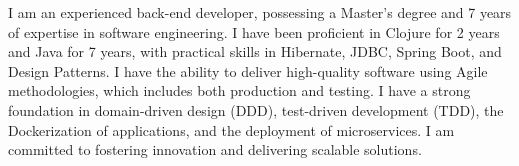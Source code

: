 \begin{referees}
\par{
    I am an experienced back-end developer, possessing a Master's degree and 7 years of expertise in software engineering. I have been proficient in Clojure for 2 years and Java for 7 years, with practical skills in Hibernate, JDBC, Spring Boot, and Design Patterns. I have the ability to deliver high-quality software using Agile methodologies, which includes both production and testing. I have a strong foundation in domain-driven design (DDD), test-driven development (TDD), the Dockerization of applications, and the deployment of microservices. I am committed to fostering innovation and delivering scalable solutions.
}
\end{referees}	